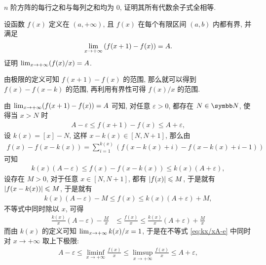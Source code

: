 \begin{exercise}[series=exer]
\begin{answer}
    \end{answer}
    \item $ n $ 阶方阵的每行之和与每列之和均为 0, 证明其所有代数余子式全相等.
    \item 设函数 $ f(x) $ 定义在 $ (a, +\infty) $, 且 $ f(x) $ 在每个有限区间 $ (a, b) $ 内都有界, 并满足
    \begin{align*}
        \lim_{x \to +\infty} \qty(f(x + 1) - f(x)) = A.
    \end{align*}
    证明 $ \lim_{x \to +\infty} (f(x) / x) = A $. 
    \begin{hint}
        由极限的定义可知 $ f(x + 1) - f(x) $ 的范围, 那么就可以得到 $ f(x) - f(x - k) $ 的范围, 再利用有界性可得 $ f(x)/x $ 的范围. 
    \end{hint}
    \begin{answer}
        由 $ \lim_{x \to +\infty} (f(x + 1) - f(x)) = A $ 可知, 对任意 $ \varepsilon > 0 $, 都存在 $ N \in \N $, 使得当 $ x > N $ 时
        \begin{align*}
            A - \varepsilon \le f(x + 1) - f(x) \le A + \varepsilon,
        \end{align*}
        设 $ k(x) = [x] - N $, 这样 $ x - k(x) \in [N, N + 1] $, 那么由
        \begin{align*}
            f(x) - f(x - k(x)) = \sum_{i = 1}^{k(x)}(f(x - k(x) + i) - f(x - k(x) + i - 1))
        \end{align*} 
        可知
        \begin{align*}
            k(x)(A - \varepsilon) \le f(x) - f(x - k(x)) \le k(x)(A + \varepsilon),
        \end{align*}
        设存在 $ M > 0 $, 对于任意 $ x \in [N, N + 1] $, 都有 $ \abs{f(x)} \leqslant M $, 于是就有 $ \abs{f(x - k(x))} \leqslant M $, 于是就有
        \begin{align*}
            k(x)(A - \varepsilon) - M \le f(x) \le k(x)(A + \varepsilon) + M,
        \end{align*}
        不等式中同时除以 $ x $, 可得
        \begin{align}\label{eq:kx/xA-e}
            \frac{k(x)}{x}(A - \varepsilon) - \frac{M}{x} & \le \frac{f(x)}{x} \le \frac{k(x)}{x}(A + \varepsilon) + \frac{M}{x}
        \end{align}
        而由 $ k(x) $ 的定义可知 $ \lim_{x \to +\infty}k(x)/x = 1 $, 于是在不等式 \eqref{eq:kx/xA-e} 中同时对 $ x \to +\infty $ 取上下极限:
        \begin{align*}
            A - \varepsilon \le \liminf_{x \to +\infty} \frac{f(x)}{x} \le \limsup_{x \to +\infty} \frac{f(x)}{x} \le A + \varepsilon,

\end{align*}
\end{answer}
\end{exercise}
